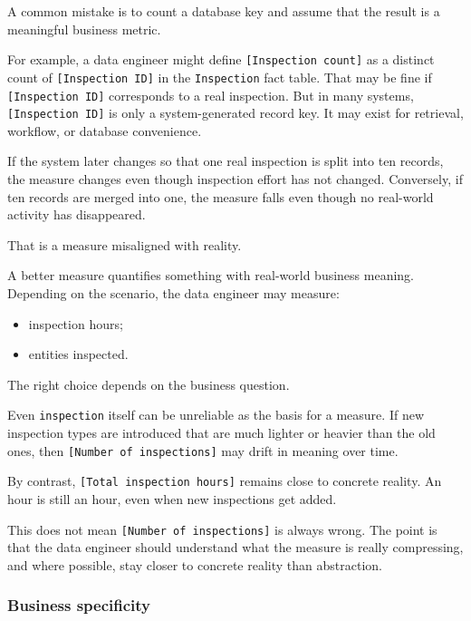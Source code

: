 \documentclass[10pt,openany,10pt]{book}
\providecommand{\tightlist}{%
  \setlength{\itemsep}{0pt}\setlength{\parskip}{0pt}}
\begin{document}
A common mistake is to count a database key and assume that the result
is a meaningful business metric.

For example, a data engineer might define
\texttt{{[}Inspection\ count{]}} as a distinct count of
\texttt{{[}Inspection\ ID{]}} in the
\texttt{\textquotesingle{}Inspection\textquotesingle{}} fact table. That
may be fine if \texttt{{[}Inspection\ ID{]}} corresponds to a real
inspection. But in many systems, \texttt{{[}Inspection\ ID{]}} is only a
system-generated record key. It may exist for retrieval, workflow, or
database convenience.

If the system later changes so that one real inspection is split into
ten records, the measure changes even though inspection effort has not
changed. Conversely, if ten records are merged into one, the measure
falls even though no real-world activity has disappeared.

That is a measure misaligned with reality.

A better measure quantifies something with real-world business meaning.
Depending on the scenario, the data engineer may measure:

\begin{itemize}
\tightlist
\item
  inspection hours;
\item
  entities inspected.
\end{itemize}

The right choice depends on the business question.

Even \texttt{inspection} itself can be unreliable as the basis for a
measure. If new inspection types are introduced that are much lighter or
heavier than the old ones, then \texttt{{[}Number\ of\ inspections{]}}
may drift in meaning over time.

By contrast, \texttt{{[}Total\ inspection\ hours{]}} remains close to
concrete reality. An hour is still an hour, even when new inspections
get added.

This does not mean \texttt{{[}Number\ of\ inspections{]}} is always
wrong. The point is that the data engineer should understand what the
measure is really compressing, and where possible, stay closer to
concrete reality than abstraction.

\subsubsection{Business specificity}\label{business-specificity}
\end{document}
